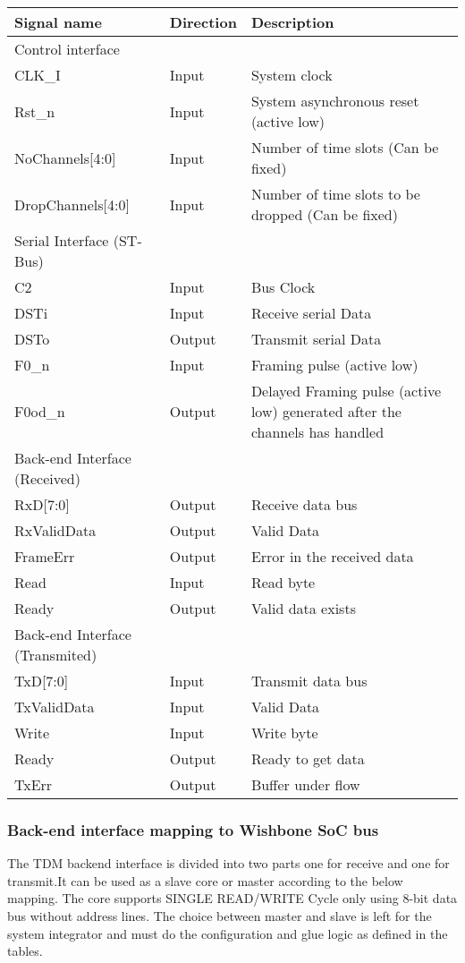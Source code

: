 \documentclass[a4paper,11pt]{article}
\begin{document}
\begin{tabular}{|l|l|l|}
\hline
Signal name& Direction& Description\\
\hline
\hline
Control interface & & \\
\hline
\hline
CLK\_I & Input & System clock \\
Rst\_n & Input & System asynchronous reset (active low)\\
NoChannels[4:0] & Input & Number of time slots (Can be fixed)\\
DropChannels[4:0] & Input & Number of time slots to be dropped (Can be fixed)\\
\hline
\hline
Serial Interface (ST-Bus)& & \\
\hline
\hline
C2 & Input & Bus Clock\\
DSTi & Input& Receive serial Data\\
DSTo & Output & Transmit serial Data\\
F0\_n & Input & Framing pulse (active low)\\
F0od\_n & Output & Delayed Framing pulse (active low) generated after the channels has handled\\
\hline
\hline
Back-end Interface (Received)& &\\
\hline
\hline
RxD[7:0]& Output& Receive data bus\\
RxValidData& Output& Valid Data\\
FrameErr& Output& Error in the received data\\
Read& Input& Read byte\\
Ready& Output& Valid data exists\\
\hline
\hline
Back-end Interface (Transmited)& &\\
\hline
\hline
TxD[7:0]& Input& Transmit data bus\\
TxValidData& Input& Valid Data\\
Write& Input& Write byte\\
Ready& Output& Ready to get data\\
TxErr& Output& Buffer under flow\\
\hline
\end{tabular}

\subsubsection{Back-end interface mapping to Wishbone SoC bus}
The TDM backend interface is divided into two parts one for receive and one for transmit.It can be used as a slave core or master according to the below mapping. The core supports SINGLE READ/WRITE Cycle only using 8-bit data bus without address lines. The choice between master and slave is left for the system integrator and must do the configuration and glue logic as defined in the tables.  
\\
\end{document}
